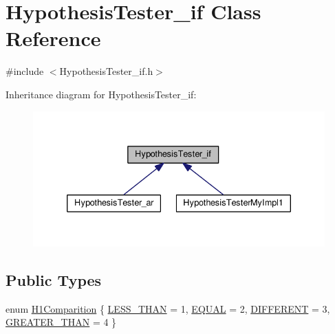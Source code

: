 \hypertarget{class_hypothesis_tester__if}{\section{Hypothesis\-Tester\-\_\-if Class Reference}
\label{class_hypothesis_tester__if}
}


{\ttfamily \#include $<$Hypothesis\-Tester\-\_\-if.\-h$>$}



Inheritance diagram for Hypothesis\-Tester\-\_\-if\-:\nopagebreak
\begin{figure}[H]
\begin{center}
\leavevmode
\includegraphics[width=335pt]{class_hypothesis_tester__if__inherit__graph}
\end{center}
\end{figure}
\subsection*{Public Types}
\begin{DoxyCompactItemize}
\item 
enum \hyperlink{class_hypothesis_tester__if_a89153ff990252f9f79856a2f2532c349}{H1\-Comparition} \{ \hyperlink{class_hypothesis_tester__if_a89153ff990252f9f79856a2f2532c349a58aba9f031dcbe91654e790416d84969}{L\-E\-S\-S\-\_\-\-T\-H\-A\-N} = 1, 
\hyperlink{class_hypothesis_tester__if_a89153ff990252f9f79856a2f2532c349a42d8b143727dc6856dddb0d0ce94c791}{E\-Q\-U\-A\-L} = 2, 
\hyperlink{class_hypothesis_tester__if_a89153ff990252f9f79856a2f2532c349acf8c0147414ce2a7cfdc8b26854464f8}{D\-I\-F\-F\-E\-R\-E\-N\-T} = 3, 
\hyperlink{class_hypothesis_tester__if_a89153ff990252f9f79856a2f2532c349ad0539d107f27b07e600a3c46da5b1934}{G\-R\-E\-A\-T\-E\-R\-\_\-\-T\-H\-A\-N} = 4
 \}
\end{DoxyCompactItemize}
